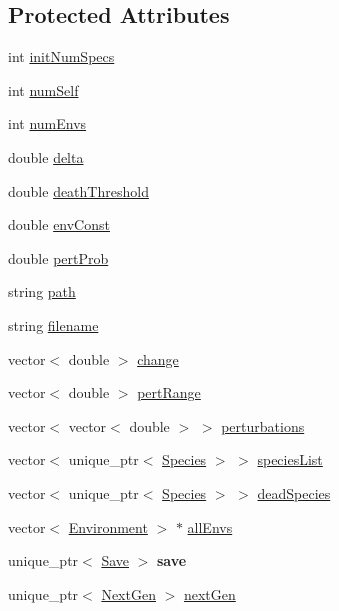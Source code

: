 \subsection*{Protected Attributes}
\begin{DoxyCompactItemize}
\item 
int \hyperlink{classEnvironment_a5c1c5043ec7885eb05d88590f405c02b}{init\+Num\+Specs}
\item 
int \hyperlink{classEnvironment_a2563f570023ff1e17f87549bcf2fab59}{num\+Self}
\item 
int \hyperlink{classEnvironment_ab9b14bfdd2e25805a6e67463e948da4a}{num\+Envs}
\item 
double \hyperlink{classEnvironment_ab21bc1c8553a1649b306dc80f7db558b}{delta}
\item 
double \hyperlink{classEnvironment_a79a718ed66d6e70b38763150b4245064}{death\+Threshold}
\item 
double \hyperlink{classEnvironment_a664313c95d2a9afc397ab4bf6f4f1457}{env\+Const}
\item 
double \hyperlink{classEnvironment_ae56ec7b378c091a2173281b01d87249b}{pert\+Prob}
\item 
string \hyperlink{classEnvironment_a27a1684288d74f2cabb8cfbd0848b14e}{path}
\item 
string \hyperlink{classEnvironment_afefeccf87332c116006372e3ee197452}{filename}
\item 
vector$<$ double $>$ \hyperlink{classEnvironment_a4dac7620968f061a62c2b51f4a29e402}{change}
\item 
vector$<$ double $>$ \hyperlink{classEnvironment_af1c4ab4f5795e5c789bcd76f80736c5c}{pert\+Range}
\item 
vector$<$ vector$<$ double $>$ $>$ \hyperlink{classEnvironment_a9339f48bc16de4c77313f70d4f201458}{perturbations}
\item 
vector$<$ unique\+\_\+ptr$<$ \hyperlink{classSpecies}{Species} $>$ $>$ \hyperlink{classEnvironment_ac27d43c32a9db69a4115d09b3145831a}{species\+List}
\item 
vector$<$ unique\+\_\+ptr$<$ \hyperlink{classSpecies}{Species} $>$ $>$ \hyperlink{classEnvironment_a5ff095d15af0aaf954a0ad9afe5d8a01}{dead\+Species}
\item 
vector$<$ \hyperlink{classEnvironment}{Environment} $>$ $\ast$ \hyperlink{classEnvironment_a429ca4342b5a89b28be803c166a48c71}{all\+Envs}
\item 
\hypertarget{classEnvironment_a65ccaef280fcfcfc20eef204c5d190ef}{}\label{classEnvironment_a65ccaef280fcfcfc20eef204c5d190ef} 
unique\+\_\+ptr$<$ \hyperlink{classSave}{Save} $>$ {\bfseries save}
\item 
unique\+\_\+ptr$<$ \hyperlink{classNextGen}{Next\+Gen} $>$ \hyperlink{classEnvironment_ad696c5a7be91ffc89586abb10281e181}{next\+Gen}
\end{DoxyCompactItemize}


